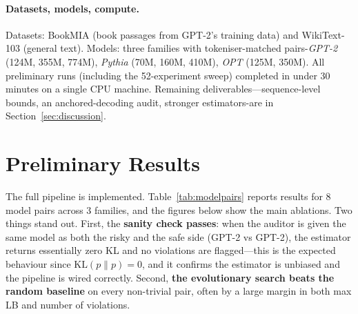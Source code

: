 \documentclass{article}
\begin{document}
\paragraph{Datasets, models, compute.}
Datasets: BookMIA \cite{shi2024bookmia} (book passages from GPT-2's training data) and WikiText-103 (general text). Models: three families with tokeniser-matched pairs-\textit{GPT-2} (124M, 355M, 774M), \textit{Pythia} (70M, 160M, 410M), \textit{OPT} (125M, 350M). All preliminary runs (including the 52-experiment sweep) completed in under 30 minutes on a single CPU machine. Remaining deliverables---sequence-level bounds, an anchored-decoding audit, stronger estimators-are in Section~\ref{sec:discussion}.


\section{Preliminary Results}
\label{sec:results}
\vspace{-2pt}

The full pipeline is implemented. Table~\ref{tab:modelpairs} reports results for 8 model pairs across 3 families, and the figures below show the main ablations. Two things stand out. First, the \textbf{sanity check passes}: when the auditor is given the same model as both the risky and the safe side (GPT-2 vs GPT-2), the estimator returns essentially zero KL and no violations are flagged---this is the expected behaviour since $\mathrm{KL}(p\|p)=0$, and it confirms the estimator is unbiased and the pipeline is wired correctly. Second, \textbf{the evolutionary search beats the random baseline} on every non-trivial pair, often by a large margin in both max LB and number of violations.
\end{document}
